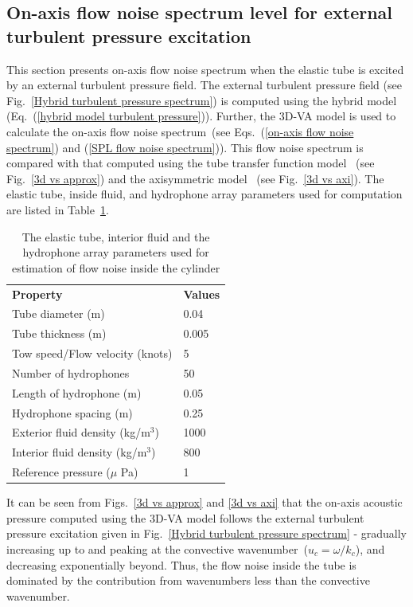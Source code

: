 \documentclass[11pt,cleanfoot]{asme2ej}
\begin{document}
\subsection{On-axis flow noise spectrum level for external turbulent pressure excitation}
\label{Interior pressure}
This section presents on-axis flow noise spectrum when the elastic tube is excited by an external turbulent pressure field. The external turbulent pressure field (see Fig.~\ref{Hybrid turbulent pressure spectrum}) is computed using the hybrid model (Eq.~(\ref{hybrid model turbulent pressure})). Further, the 3D-VA model is used to calculate the on-axis flow noise spectrum~(see Eqs.~(\ref{on-axis flow noise spectrum}) and (\ref{SPL flow noise spectrum})). This flow noise spectrum is compared with that computed using the tube transfer function model~\cite{knight1996} (see Fig.~\ref{3d vs approx}) and the axisymmetric model~\cite{jineesh2013} (see Fig.~\ref{3d vs axi}). The elastic tube, inside fluid, and hydrophone array parameters used for computation are listed in Table~\ref{tab:PresentVsJineesh}.
\begin{table}[t]
\caption{The elastic tube, interior fluid and the hydrophone array parameters used for estimation of flow noise inside the cylinder}
\begin{center}
\label{tab:PresentVsJineesh}
\begin{tabular}{l l}
& \\ %
 \hline
 \textbf{Property} & \textbf{Values}  \\ 
 \hline
 Tube diameter (m)  & 0.04 \\
 Tube thickness (m) & 0.005 \\
 Tow speed/Flow velocity (knots) & 5 \\
 Number of hydrophones & 50 \\
 Length of hydrophone (m) & 0.05 \\
 Hydrophone spacing (m) & 0.25 \\
 Exterior fluid density (kg/m$^{3}$) & 1000 \\
 Interior fluid density (kg/m$^{3}$) & 800 \\
 Reference pressure ($\mu$ Pa) & 1  \\ 
\hline
\end{tabular}
\end{center}
\end{table}
It can be seen from Figs.~\ref{3d vs approx} and \ref{3d vs axi} that the on-axis acoustic pressure computed using the 3D-VA model follows the external turbulent pressure excitation given in Fig.~\ref{Hybrid turbulent pressure spectrum} - gradually increasing up to and peaking at the convective wavenumber~($u_c = \omega/k_c$), and decreasing exponentially beyond. Thus, the flow noise inside the tube is dominated by the contribution from wavenumbers less than the convective wavenumber.
\end{document}
